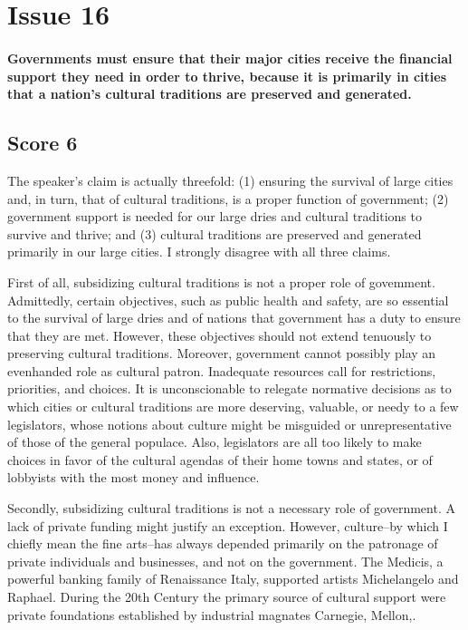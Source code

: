 \section{Issue 16}
\paragraph{
Governments must ensure that their major cities receive the financial support they need in order to thrive, because it is primarily in cities that a nation's cultural traditions are preserved and generated.
}
\subsection{Score 6}


The speaker's claim is actually threefold: (1) ensuring the survival of large cities and, in turn, that of cultural traditions, is a proper function of government; (2) government support is needed for our large dries and cultural traditions to survive and thrive; and (3) cultural traditions are preserved and generated primarily in our large cities.
I strongly disagree with all three claims.


First of all, subsidizing cultural traditions is not a proper role of govemment.
Admittedly, certain objectives, such as public health and safety, are so essential to the survival of large dries and of nations that government has a duty to ensure that they are met.
However, these objectives should not extend tenuously to preserving cultural traditions.
Moreover, government cannot possibly play an evenhanded role as cultural patron.
Inadequate resources call for restrictions, priorities, and choices.
It is unconscionable to relegate normative decisions as to which cities or cultural traditions are more deserving, valuable, or needy to a few legislators, whose notions about culture might be misguided or unrepresentative of those of the general populace.
Also, legislators are all too likely to make choices in favor of the cultural agendas of their home towns and states, or of lobbyists with the most money and influence.


Secondly, subsidizing cultural traditions is not a necessary role of government.
A lack of private funding might justify an exception.
However, culture--by which I chiefly mean the fine arts--has always depended primarily on the patronage of private individuals and businesses, and not on the government.
The Medicis, a powerful banking family of Renaissance Italy, supported artists Michelangelo and Raphael.
During the 20th Century the primary source of cultural support were private foundations established by industrial magnates Carnegie, Mellon,.


